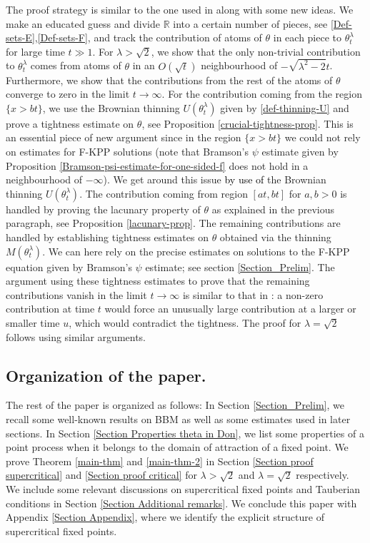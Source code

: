 \documentclass[a4paper,reqno]{amsart}%
\newcommand{\1}{\mathbf 1}
\theoremstyle{mine}
\numberwithin{theorem}{section}
\numberwithin{equation}{section}
\theoremstyle{remark}
\begin{document}
The proof strategy is similar to the one used in \cite{Shekhar_FP} along with some new ideas. We make an educated guess and divide $\mathbb{R}$ into a certain number of pieces, see \eqref{Def-sets-E},\eqref{Def-sets-F}, and track the contribution of atoms of $\theta$ in each piece to $\theta_t^\lambda$ for large time $t \gg 1$. For $\lambda >\sqrt{2}$, we show that the only non-trivial contribution to $\theta_t^\lambda$ comes from atoms of $\theta$ in an $O(\sqrt{t})$ neighbourhood of $-\sqrt{\lambda^2 -2}t$. Furthermore, we show that the contributions from the rest of the atoms of $\theta$ converge to zero in the limit $t\to \infty$. For the contribution coming from the region $\{x >bt\}$, we use the Brownian thinning $U(\theta_t^\lambda)$ given by \eqref{def-thinning-U} and prove a tightness estimate on $\theta$, see Proposition \ref{crucial-tightness-prop}.
This is an essential piece of new argument since in the region $\{x>bt\}$ we could not rely on estimates for F-KPP solutions (note that Bramson's $\psi$ estimate given by Proposition \ref{Bramson-psi-estimate-for-one-sided-f} does not hold in a neighbourhood of $-\infty$). We get around this issue \textcolor{black}{by use of} the Brownian thinning $U(\theta_t^\lambda)$. The contribution coming from region $[at, bt]$ for $a,b>0$ is handled by proving the lacunary property of $\theta$ as explained in the previous paragraph, see Proposition \ref{lacunary-prop}. The remaining contributions are handled by establishing tightness estimates on $\theta$ obtained via the thinning $M(\theta_t^\lambda)$. We can here rely on the precise estimates on solutions to the F-KPP equation given by Bramson's $\psi$ estimate; see section \ref{Section_Prelim}. The argument using these tightness estimates to prove that the remaining contributions vanish in the limit $t\to \infty$ is similar to that in \cite{Shekhar_FP}: a non-zero contribution at time $t$ would force an unusually large contribution at a larger or smaller time $u$, which would contradict the tightness. The proof for $\lambda = \sqrt{2}$ follows using similar arguments. 


    

\subsection{Organization of the paper.}

The rest of the paper is organized as follows: In Section \ref{Section_Prelim}, we recall some well-known results on BBM as well as some estimates used in later sections.
In Section \ref{Section Properties theta in Don}, we list some properties of a point process when it belongs to the domain of attraction of a fixed point.
We prove Theorem \ref{main-thm} and \ref{main-thm-2} in Section \ref{Section proof supercritical} and \ref{Section proof critical} for $\lambda > \sqrt 2$ and $\lambda=\sqrt 2$ respectively.
We include some relevant discussions on supercritical fixed points and Tauberian conditions in Section \ref{Section Additional remarks}.
We conclude this paper with Appendix \ref{Section Appendix}, where we identify the explicit structure of supercritical fixed points.
\end{document}
